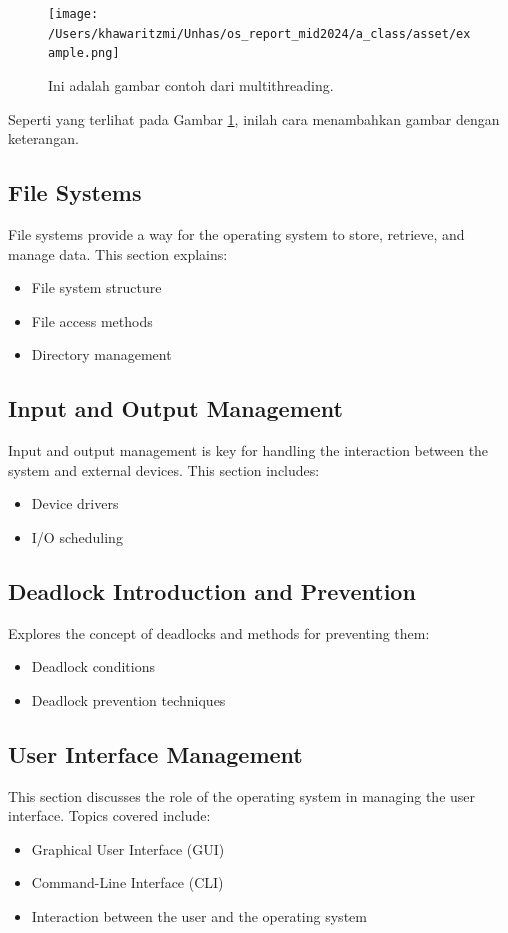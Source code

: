 \documentclass[12pt]{article}
\begin{document}
\hspace{1cm}
\hline
\hspace{1cm}

\begin{figure}[h]
    \centering
    \texttt{[image: /Users/khawaritzmi/Unhas/os\_report\_mid2024/a\_class/asset/example.png]}  %
    \caption{Ini adalah gambar contoh dari multithreading.}
    \label{fig:contoh_gambar}
\end{figure}

Seperti yang terlihat pada Gambar \ref{fig:contoh_gambar}, inilah cara menambahkan gambar dengan keterangan.

\subsection{File Systems}
File systems provide a way for the operating system to store, retrieve, and manage data. This section explains:
\begin{itemize}
    \item File system structure
    \item File access methods
    \item Directory management
\end{itemize}

\subsection{Input and Output Management}
Input and output management is key for handling the interaction between the system and external devices. This section includes:
\begin{itemize}
    \item Device drivers
    \item I/O scheduling
\end{itemize}

\subsection{Deadlock Introduction and Prevention}
Explores the concept of deadlocks and methods for preventing them:
\begin{itemize}
    \item Deadlock conditions
    \item Deadlock prevention techniques
\end{itemize}

\subsection{User Interface Management}
This section discusses the role of the operating system in managing the user interface. Topics covered include:
\begin{itemize}
    \item Graphical User Interface (GUI)
    \item Command-Line Interface (CLI)
    \item Interaction between the user and the operating system
\end{itemize}
\end{document}
